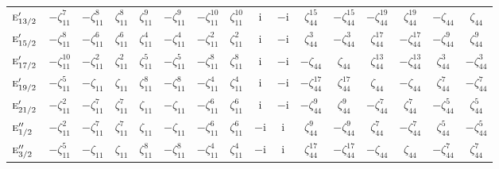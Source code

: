 \documentclass[10pt,a4paper]{article}
\numberwithin{equation}{section}
\newcommand{\irr}[1]{\text{\normalfont\scshape #1}}
\newcommand{\iunit}{\mathrm{i}}
\newcommand{\rootunity}[1]{\zeta_{#1}}
\begin{document}
{\begin{longtable}{@{}lccccccccccccccc@{}}
$\irr{e}_{13/2}'$ & $-\rootunity{11}^{7}$ & $-\rootunity{11}^{8}$ & $\rootunity{11}^{8}$ & $\rootunity{11}^{9}$ & $-\rootunity{11}^{9}$ & $-\rootunity{11}^{10}$ & $\rootunity{11}^{10}$ & $\iunit{}$ & $-\iunit{}$ & $\rootunity{44}^{15}$ & $-\rootunity{44}^{15}$ & $-\rootunity{44}^{19}$ & $\rootunity{44}^{19}$ & $-\rootunity{44}$ & $\rootunity{44}$\\
$\irr{e}_{15/2}'$ & $-\rootunity{11}^{8}$ & $-\rootunity{11}^{6}$ & $\rootunity{11}^{6}$ & $\rootunity{11}^{4}$ & $-\rootunity{11}^{4}$ & $-\rootunity{11}^{2}$ & $\rootunity{11}^{2}$ & $\iunit{}$ & $-\iunit{}$ & $\rootunity{44}^{3}$ & $-\rootunity{44}^{3}$ & $\rootunity{44}^{17}$ & $-\rootunity{44}^{17}$ & $-\rootunity{44}^{9}$ & $\rootunity{44}^{9}$\\
$\irr{e}_{17/2}'$ & $-\rootunity{11}^{10}$ & $-\rootunity{11}^{2}$ & $\rootunity{11}^{2}$ & $\rootunity{11}^{5}$ & $-\rootunity{11}^{5}$ & $-\rootunity{11}^{8}$ & $\rootunity{11}^{8}$ & $\iunit{}$ & $-\iunit{}$ & $-\rootunity{44}$ & $\rootunity{44}$ & $\rootunity{44}^{13}$ & $-\rootunity{44}^{13}$ & $\rootunity{44}^{3}$ & $-\rootunity{44}^{3}$\\
$\irr{e}_{19/2}'$ & $-\rootunity{11}^{5}$ & $-\rootunity{11}$ & $\rootunity{11}$ & $\rootunity{11}^{8}$ & $-\rootunity{11}^{8}$ & $-\rootunity{11}^{4}$ & $\rootunity{11}^{4}$ & $\iunit{}$ & $-\iunit{}$ & $-\rootunity{44}^{17}$ & $\rootunity{44}^{17}$ & $\rootunity{44}$ & $-\rootunity{44}$ & $\rootunity{44}^{7}$ & $-\rootunity{44}^{7}$\\
$\irr{e}_{21/2}'$ & $-\rootunity{11}^{2}$ & $-\rootunity{11}^{7}$ & $\rootunity{11}^{7}$ & $\rootunity{11}$ & $-\rootunity{11}$ & $-\rootunity{11}^{6}$ & $\rootunity{11}^{6}$ & $\iunit{}$ & $-\iunit{}$ & $-\rootunity{44}^{9}$ & $\rootunity{44}^{9}$ & $-\rootunity{44}^{7}$ & $\rootunity{44}^{7}$ & $-\rootunity{44}^{5}$ & $\rootunity{44}^{5}$\\
$\irr{e}_{1/2}''$ & $-\rootunity{11}^{2}$ & $-\rootunity{11}^{7}$ & $\rootunity{11}^{7}$ & $\rootunity{11}$ & $-\rootunity{11}$ & $-\rootunity{11}^{6}$ & $\rootunity{11}^{6}$ & $-\iunit{}$ & $\iunit{}$ & $\rootunity{44}^{9}$ & $-\rootunity{44}^{9}$ & $\rootunity{44}^{7}$ & $-\rootunity{44}^{7}$ & $\rootunity{44}^{5}$ & $-\rootunity{44}^{5}$\\
$\irr{e}_{3/2}''$ & $-\rootunity{11}^{5}$ & $-\rootunity{11}$ & $\rootunity{11}$ & $\rootunity{11}^{8}$ & $-\rootunity{11}^{8}$ & $-\rootunity{11}^{4}$ & $\rootunity{11}^{4}$ & $-\iunit{}$ & $\iunit{}$ & $\rootunity{44}^{17}$ & $-\rootunity{44}^{17}$ & $-\rootunity{44}$ & $\rootunity{44}$ & $-\rootunity{44}^{7}$ & $\rootunity{44}^{7}$\\

\end{longtable}}
\end{document}
